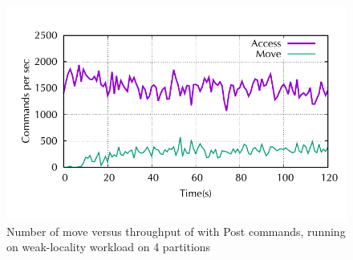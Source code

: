 \begin{figure}[ht!]
\begin{minipage}[b]{1\linewidth}
\centering
      \includegraphics[width=0.6\linewidth]{figures/experiments/dssmr/move-vs-throughput-weak}
\end{minipage}
\caption{Number of move versus throughput of \dynastar with Post commands, running on weak-locality workload on 4 partitions}
\label{fig:dssmr-move-vs-tp-weak}
\end{figure}

